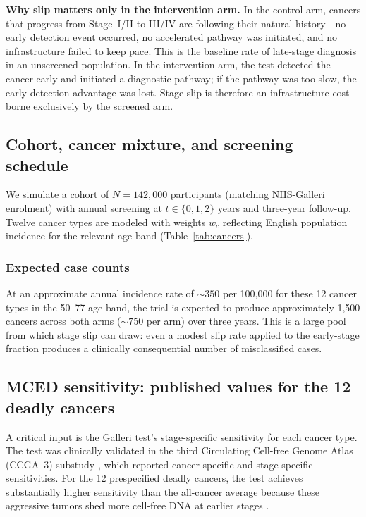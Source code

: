 \documentclass[11pt,letter]{article}
\begin{document}
\noindent\textbf{Why slip matters only in the intervention arm.} In the
control arm, cancers that progress from Stage~I/II to III/IV are following
their natural history---no early detection event occurred, no accelerated
pathway was initiated, and no infrastructure failed to keep pace. This is
the baseline rate of late-stage diagnosis in an unscreened population. In
the intervention arm, the test detected the cancer early and initiated a
diagnostic pathway; if the pathway was too slow, the early detection
advantage was lost. Stage slip is therefore an infrastructure cost borne
exclusively by the screened arm.


\subsection{Cohort, cancer mixture, and screening schedule}

We simulate a cohort of $N = 142{,}000$ participants (matching NHS-Galleri
enrolment) with annual screening at $t \in \{0, 1, 2\}$ years and
three-year follow-up. Twelve cancer types are modeled with weights $w_c$
reflecting English population incidence for the relevant age band
(Table~\ref{tab:cancers}).

\subsubsection{Expected case counts}

At an approximate annual incidence rate of ${\sim}350$ per 100,000 for these
12 cancer types in the 50--77 age band, the trial is expected to produce
approximately 1,500 cancers across both arms (${\sim}750$ per arm) over
three years. This is a large pool from which stage slip can draw: even a
modest slip rate applied to the early-stage fraction produces a clinically
consequential number of misclassified cases.


\subsection{MCED sensitivity: published values for the 12 deadly cancers}
\label{sec:sensitivity}

A critical input is the Galleri test's stage-specific sensitivity for each
cancer type. The test was clinically validated in the third Circulating
Cell-free Genome Atlas (CCGA~3) substudy \cite{Klein2021, Liu2020}, which
reported cancer-specific and stage-specific sensitivities. For the 12
prespecified deadly cancers, the test achieves substantially higher
sensitivity than the all-cancer average because these aggressive tumors shed
more cell-free DNA at earlier stages \cite{Klein2021, Shao2022}.
\end{document}

